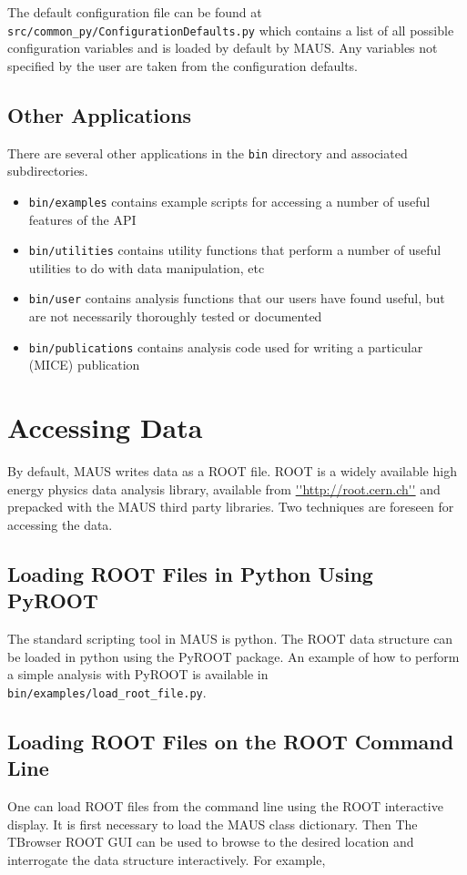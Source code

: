 The default configuration file can be found at \verb|src/common_py/ConfigurationDefaults.py| which contains a list of all possible configuration variables and is loaded by default by MAUS. Any variables not specified by the user are taken from the configuration defaults.

\subsection{Other Applications}
There are several other applications in the \verb|bin| directory and associated subdirectories.
\begin{itemize}
\item \verb|bin/examples| contains example scripts for accessing a number of useful features of the API
\item \verb|bin/utilities| contains utility functions that perform a number of useful utilities to do with data manipulation, etc
\item \verb|bin/user| contains analysis functions that our users have found useful, but are not necessarily thoroughly tested or documented
\item \verb|bin/publications| contains analysis code used for writing a particular (MICE) publication
\end{itemize}

\section{Accessing Data}
By default, MAUS writes data as a ROOT file. ROOT is a widely available high energy physics data analysis library, available from \url{''http://root.cern.ch''} and prepacked with the MAUS third party libraries. Two techniques are foreseen for accessing the data.

\subsection{Loading ROOT Files in Python Using PyROOT}
The standard scripting tool in MAUS is python. The ROOT data structure can be loaded in python using the PyROOT package. An example of how to perform a simple analysis with PyROOT is available in \verb|bin/examples/load_root_file.py|.

\subsection{Loading ROOT Files on the ROOT Command Line}
One can load ROOT files from the command line using the ROOT interactive display. It is first necessary to load the MAUS class dictionary. Then The TBrowser ROOT GUI can be used to browse to the desired location and interrogate the data structure interactively. For example,

